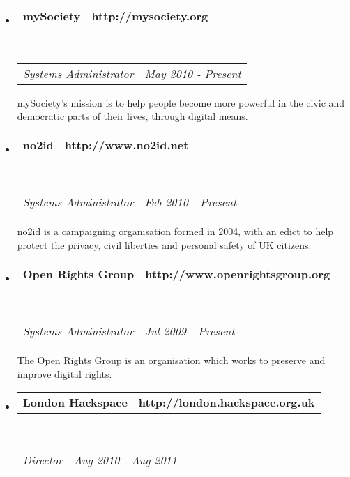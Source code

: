\documentclass[10pt,a4paper]{article}
\makeatletter
\newcommand{\headerrow}[2]
{\begin{tabular*}{\linewidth}{l@{\extracolsep{\fill}}r}
	#1 &
	#2 \\
\end{tabular*}}
\makeatother
\begin{document}
\begin{itemize}
	\parskip=0.1em
	\item
	\headerrow
		{\textbf{mySociety}}
		{\textbf{http://mysociety.org}}
	\\
	\headerrow
		{\emph{Systems Administrator}}
		{\emph{May 2010 - Present}}

		mySociety’s mission is to help people become more powerful in the civic and democratic parts of their lives, through digital means. 

	\item
	\headerrow
		{\textbf{no2id}}
		{\textbf{http://www.no2id.net}}
	\\
	\headerrow
		{\emph{Systems Administrator}}
		{\emph{Feb 2010 - Present}}

		no2id is a campaigning organisation formed in 2004, with an edict to help protect the privacy, civil liberties and personal safety of UK citizens.	
	\item
	\headerrow
		{\textbf{Open Rights Group}}
		{\textbf{http://www.openrightsgroup.org}}
	\\
	\headerrow
		{\emph{Systems Administrator}}
		{\emph{Jul 2009 - Present}}

		The Open Rights Group is an organisation which works to preserve and improve digital rights.

	\item
	\headerrow
		{\textbf{London Hackspace}}
		{\textbf{http://london.hackspace.org.uk}}
	\\
	\headerrow
		{\emph{Director}}
		{\emph{Aug 2010 - Aug 2011}}


\end{itemize}
\end{document}
